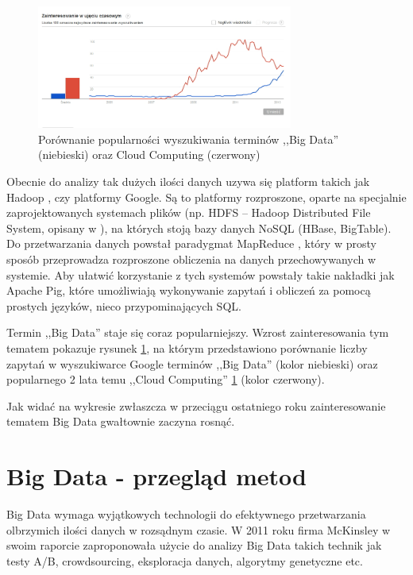 \documentclass[10pt,twocolumn]{llncs}          %
\begin{document}
\begin{figure}
    \centerline{\includegraphics[width=0.75\textwidth]{obrazki/trend-big-data_cloud-computing.png}}
    \caption{Porównanie popularności wyszukiwania terminów ,,Big Data'' (niebieski) oraz Cloud Computing (czerwony)}
    \label{fig:big_data_popularnosc}       %
\end{figure}

Obecnie do analizy tak dużych ilości danych uzywa się platform takich jak Hadoop \cite{apache:hadoop}, czy platformy Google. Są to platformy rozproszone, oparte na specjalnie zaprojektowanych systemach plików (np. HDFS -- Hadoop Distributed File System, opisany w \cite{shvachko10}), na których stoją bazy danych NoSQL (HBase, BigTable). Do przetwarzania danych powstał paradygmat MapReduce \cite{dean08}, który w prosty sposób przeprowadza rozproszone obliczenia na danych przechowywanych w systemie. Aby ułatwić korzystanie z tych systemów powstały takie nakładki jak Apache Pig, które umożliwiają wykonywanie zapytań i obliczeń za pomocą prostych języków, nieco przypominających SQL.

Termin ,,Big Data'' staje się coraz popularniejszy. Wzrost zainteresowania tym tematem pokazuje rysunek \ref{fig:big_data_popularnosc}, na którym przedstawiono porównanie liczby zapytań w wyszukiwarce Google terminów ,,Big Data'' (kolor niebieski) oraz popularnego 2 lata temu ,,Cloud Computing'' \ref{fig:big_data_popularnosc} (kolor czerwony).



Jak widać na wykresie zwłaszcza w przeciągu ostatniego roku zainteresowanie tematem Big Data gwałtownie zaczyna rosnąć.


\section{Big Data - przegląd metod}
\label{sub:metody}
Big Data wymaga wyjątkowych technologii do efektywnego przetwarzania olbrzymich ilości danych w rozsądnym czasie. W 2011 roku firma {McKinsley} w swoim raporcie \cite{McKinsey2011} zaproponowała użycie do analizy Big Data takich technik jak testy A/B, crowdsourcing, eksploracja danych, algorytmy genetyczne etc.
\end{document}

